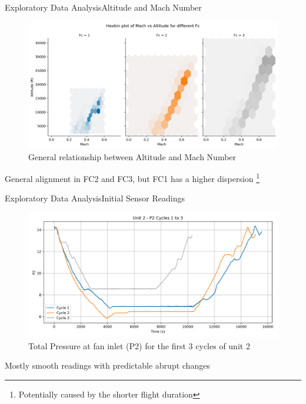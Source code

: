 \documentclass{beamer}
\begin{document}
        \begin{frame}{Exploratory Data Analysis}{Altitude and Mach Number}
            \begin{figure}[!htbp]
                \centering
                \includegraphics[scale=0.35]{mach_altitude.png}
                \caption{General relationship between Altitude and Mach Number}
            \end{figure}

            General alignment in FC2 and FC3, but FC1 has a higher dispersion \footnote{Potentially caused by the shorter flight duration}
        \end{frame}

        \begin{frame}{Exploratory Data Analysis}{Initial Sensor Readings}
            \begin{figure}[!htbp]
                \centering
                \includegraphics[scale=0.35]{unit_2_P2_cycles_1_3.png}
                \caption{Total Pressure at fan inlet (P2) for the first 3 cycles of unit 2}
            \end{figure}
            Mostly smooth readings with predictable abrupt changes
        \end{frame}
\end{document}
